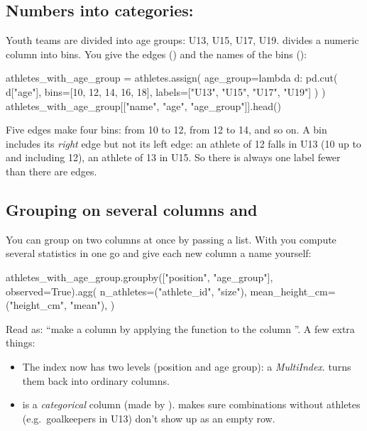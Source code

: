 \documentclass[11pt,a4paper]{article}
\begin{document}
\subsection{Numbers into categories: }

Youth teams are divided into age groups: U13, U15, U17, U19.
 divides a numeric column into bins. You give the edges
() and the names of the bins ():

\begin{python}
athletes_with_age_group = athletes.assign(
    age_group=lambda d: pd.cut(
        d["age"], bins=[10, 12, 14, 16, 18], labels=["U13", "U15", "U17", "U19"]
    )
)
athletes_with_age_group[["name", "age", "age_group"]].head()
\end{python}

Five edges make four bins: from 10 to 12, from 12 to 14, and so on. A
bin includes its \emph{right} edge but not its left edge: an athlete of
12 falls in U13 (10 up to and including 12), an athlete of 13 in U15. So
there is always one label fewer than there are edges.

\subsection{Grouping on several columns and }

You can group on two columns at once by passing a list. With
 you compute several statistics in one go and give each
new column a name yourself:

\begin{python}
athletes_with_age_group.groupby(["position", "age_group"], observed=True).agg(
    n_athletes=("athlete_id", "size"),
    mean_height_cm=("height_cm", "mean"),
)
\end{python}

Read  as: ``make a column
 by applying the function  to the
column ''. A few extra things:

\begin{itemize}
  \item The index now has two levels (position and age group): a
        \emph{MultiIndex}.  turns them back into
        ordinary columns.
  \item {} is a \emph{categorical} column (made by
        ).  makes sure combinations
        without athletes (e.g.\ goalkeepers in U13) don't show up as an
        empty row.
\end{itemize}
\end{document}
